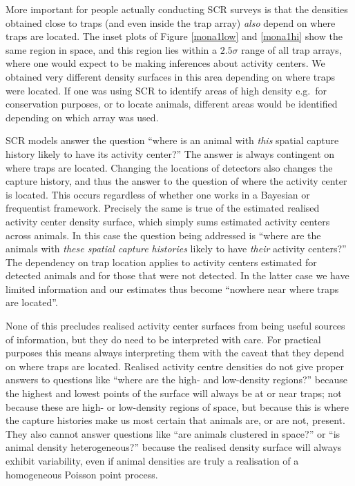 \documentclass[a4paper,12pt]{article}
\begin{document}
More important for people actually conducting SCR surveys is that the densities obtained close to traps (and even inside the trap array) {\it also} depend on where traps are located. The inset plots of Figure \ref{mona1low} and \ref{mona1hi} show the same region in space, and this region lies within a $2.5\sigma$ range of all trap arrays, where one would expect to be making inferences about activity centers. We obtained very different density surfaces in this area depending on where traps were located. If one was using SCR to identify areas of high density e.g.\ for conservation purposes, or to locate animals, different areas would be identified depending on which array was used. 

SCR models answer the question ``where is an animal with {\it this} spatial capture history likely to have its activity center?'' The answer is always contingent on where traps are located. Changing the locations of detectors also changes the capture history, and thus the answer to the question of where the activity center is located. This occurs regardless of whether one works in a Bayesian or frequentist framework. Precisely the same is true of the estimated realised activity center density surface, which simply sums estimated activity centers across animals. In this case the question being addressed is ``where are the animals with {\it these spatial capture histories} likely to have {\it their} activity centers?'' The dependency on trap location applies to activity centers estimated for detected animals and for those that were not detected. In the latter case we have limited information and our estimates thus become ``nowhere near where traps are located''. 

None of this precludes realised activity center surfaces from being useful sources of information, but they do need to be interpreted with care. For practical purposes this means always interpreting them with the caveat that they depend on where traps are located. Realised activity centre densities do not give proper answers to questions like ``where are the high- and low-density regions?'' because the highest and lowest points of the surface will always be at or near traps; not because these are high- or low-density regions of space, but because this is where the capture histories make us most certain that animals are, or are not, present. They also cannot answer questions like ``are animals clustered in space?'' or ``is animal density heterogeneous?'' because the realised density surface will always exhibit variability, even if animal densities are truly a realisation of a homogeneous Poisson point process.
\end{document}
